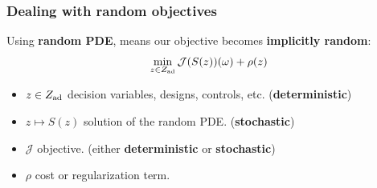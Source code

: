 \documentclass[aspectratio=169,xcolor=dvipsnames,10pt]{beamer}
\begin{document}
\begin{frame}\frametitle{Dealing with random objectives}
\begin{exampleblock}{}
Using \textbf{random PDE}, means our objective becomes \textbf{implicitly random}:
\[
\min_{z \in Z_{\rm ad}} \mathcal{J}(S(z))(\omega) + \rho(z)
\]
\begin{itemize}
\item $z \in Z_{\rm ad}$ decision variables, designs, controls, etc. (\textbf{deterministic})
\item $z \mapsto S(z)$ solution of the random PDE.  (\textbf{stochastic})
\item $\mathcal{J}$ objective. (either \textbf{deterministic} or \textbf{stochastic})
\item $\rho$ cost or regularization term.
\end{itemize}
\end{exampleblock}
\end{frame}
\end{document}
